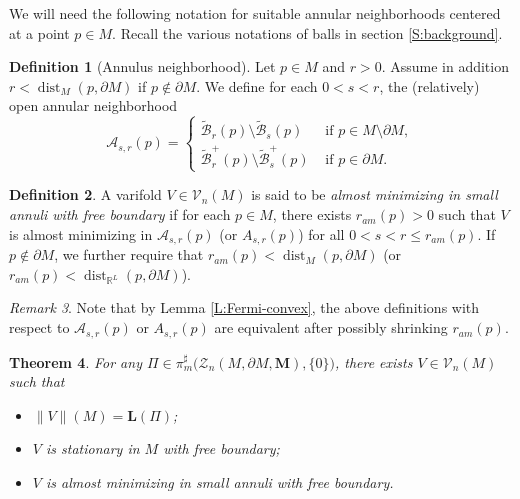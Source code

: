 \documentclass[10pt]{amsart}
\newtheorem{theorem}{Theorem}[section]
\theoremstyle{definition}
\newtheorem{definition}[theorem]{Definition}
\theoremstyle{remark}
\newtheorem{remark}[theorem]{Remark}
\numberwithin{equation}{section}
\newcommand{\V}{\mathcal{V}}
\newcommand{\R}{\mathbb{R}}
\newcommand{\A}{\mathcal{A}}
\newcommand{\Z}{\mathcal{Z}}
\newcommand{\M}{\mathbf{M}}
\newcommand{\bL}{\mathbf{L}}
\newcommand{\tBcal}{\widetilde{\mathcal{B}}}
\newcommand{\dist}{\operatorname{dist}}
\begin{document}
We will need the following notation for suitable annular neighborhoods centered at a point $p \in M$. Recall the various notations of balls in section \ref{S:background}.

\begin{definition}[Annulus neighborhood]
\label{D:annulus}
Let $p \in M$ and $r>0$. Assume in addition $r < \dist_M(p,\partial M)$ if $p \notin \partial M$. We define for each $0<s<r$, the (relatively) open annular neighborhood
\[ \A_{s,r}(p)= \left\{ \begin{array}{cl}
\tBcal_r(p) \setminus \tBcal_s(p) & \text{ if } p \in M \setminus \partial M, \\
\tBcal^+_r(p) \setminus \tBcal^+_s(p) & \text{ if } p \in \partial M. 
\end{array} \right. \]
\end{definition}

\begin{definition}
\label{D:am-annuli}
A varifold $V \in \V_n(M)$ is said to be \emph{almost minimizing in small annuli with free boundary} if for each $p\in M$, there exists $r_{am}(p) >0$ such that $V$ is almost minimizing in $\mathcal{A}_{s,r}(p)$ (or $A_{s, r}(p)$) for all $0<s<r\leq r_{am}(p)$. If $p \notin \partial M$, we further require that $r_{am}(p) < \dist_M(p,\partial M)$ (or $r_{am}(p)<\dist_{\R^L}(p, \partial M)$).
\end{definition}
\begin{remark}
Note that by Lemma \ref{L:Fermi-convex}, the above definitions with respect to $\mathcal{A}_{s,r}(p)$ or $A_{s, r}(p)$ are equivalent after possibly shrinking $r_{am}(p)$.
\end{remark}

\begin{theorem}
\label{T:combinatorial}
For any $\Pi  \in \pi^{\sharp}_{m}\big(\Z_{n}(M, \partial M, \M), \{0\}\big)$, there exists $V\in\V_n(M)$ such that
\begin{itemize}
\item[(i)] $\|V\|(M)=\bL(\Pi)$;
\item[(ii)] $V$ is stationary in $M$ with free boundary;
\item[(iii)] $V$ is almost minimizing in small annuli with free boundary.
\end{itemize}
\end{theorem}
\end{document}
